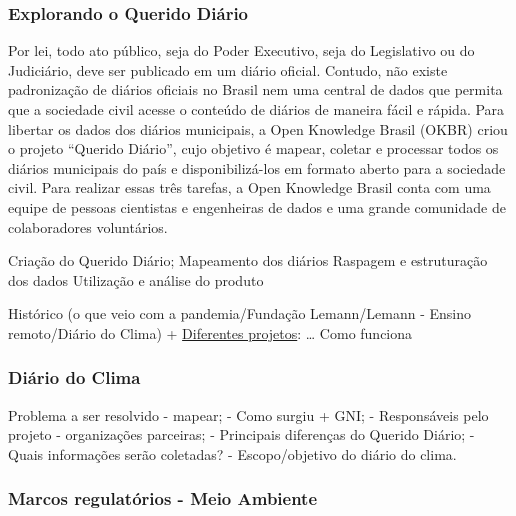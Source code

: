 \documentclass[
]{article}
\begin{document}
\hypertarget{explorando-o-querido-diuxe1rio}{%
\subsubsection{Explorando o Querido
Diário}\label{explorando-o-querido-diuxe1rio}}

Por lei, todo ato público, seja do Poder Executivo, seja do Legislativo
ou do Judiciário, deve ser publicado em um diário oficial. Contudo, não
existe padronização de diários oficiais no Brasil nem uma central de
dados que permita que a sociedade civil acesse o conteúdo de diários de
maneira fácil e rápida. Para libertar os dados dos diários municipais, a
Open Knowledge Brasil (OKBR) criou o projeto ``Querido Diário'', cujo
objetivo é mapear, coletar e processar todos os diários municipais do
país e disponibilizá-los em formato aberto para a sociedade civil. Para
realizar essas três tarefas, a Open Knowledge Brasil conta com uma
equipe de pessoas cientistas e engenheiras de dados e uma grande
comunidade de colaboradores voluntários.

Criação do Querido Diário; Mapeamento dos diários Raspagem e
estruturação dos dados Utilização e análise do produto

Histórico (o que veio com a pandemia/Fundação Lemann/Lemann - Ensino
remoto/Diário do Clima) +
\href{https://queridodiario.ok.org.br/sobre\#historia}{Diferentes
projetos}: \ldots{} Como funciona

\hypertarget{diuxe1rio-do-clima}{%
\subsubsection{Diário do Clima}\label{diuxe1rio-do-clima}}

Problema a ser resolvido - mapear; - Como surgiu + GNI; - Responsáveis
pelo projeto - organizações parceiras; - Principais diferenças do
Querido Diário; - Quais informações serão coletadas? - Escopo/objetivo
do diário do clima.

\hypertarget{marcos-regulatuxf3rios---meio-ambiente}{%
\subsubsection{Marcos regulatórios - Meio
Ambiente}\label{marcos-regulatuxf3rios---meio-ambiente}}
\end{document}
